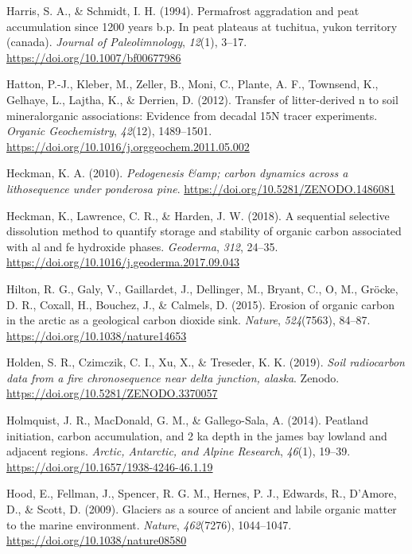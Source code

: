 \documentclass[]{article}
\begin{document}
\leavevmode\hypertarget{ref-Harris_1994}{}%
Harris, S. A., \& Schmidt, I. H. (1994). Permafrost aggradation and peat
accumulation since 1200 years b.p. In peat plateaus at tuchitua, yukon
territory (canada). \emph{Journal of Paleolimnology}, \emph{12}(1),
3--17. \url{https://doi.org/10.1007/bf00677986}

\leavevmode\hypertarget{ref-Hatton_2012}{}%
Hatton, P.-J., Kleber, M., Zeller, B., Moni, C., Plante, A. F.,
Townsend, K., Gelhaye, L., Lajtha, K., \& Derrien, D. (2012). Transfer
of litter-derived n to soil mineralorganic associations: Evidence from
decadal 15N tracer experiments. \emph{Organic Geochemistry},
\emph{42}(12), 1489--1501.
\url{https://doi.org/10.1016/j.orggeochem.2011.05.002}

\leavevmode\hypertarget{ref-https:ux2fux2fdoi.orgux2f10.5281ux2fzenodo.1486081}{}%
Heckman, K. A. (2010). \emph{Pedogenesis \&amp; carbon dynamics across a
lithosequence under ponderosa pine}.
\url{https://doi.org/10.5281/ZENODO.1486081}

\leavevmode\hypertarget{ref-Heckman_2018}{}%
Heckman, K., Lawrence, C. R., \& Harden, J. W. (2018). A sequential
selective dissolution method to quantify storage and stability of
organic carbon associated with al and fe hydroxide phases.
\emph{Geoderma}, \emph{312}, 24--35.
\url{https://doi.org/10.1016/j.geoderma.2017.09.043}

\leavevmode\hypertarget{ref-Hilton_2015}{}%
Hilton, R. G., Galy, V., Gaillardet, J., Dellinger, M., Bryant, C.,
O\textquotesingleRegan, M., Gröcke, D. R., Coxall, H., Bouchez, J., \&
Calmels, D. (2015). Erosion of organic carbon in the arctic as a
geological carbon dioxide sink. \emph{Nature}, \emph{524}(7563), 84--87.
\url{https://doi.org/10.1038/nature14653}

\leavevmode\hypertarget{ref-https:ux2fux2fdoi.orgux2f10.5281ux2fzenodo.3370057}{}%
Holden, S. R., Czimczik, C. I., Xu, X., \& Treseder, K. K. (2019).
\emph{Soil radiocarbon data from a fire chronosequence near delta
junction, alaska}. Zenodo. \url{https://doi.org/10.5281/ZENODO.3370057}

\leavevmode\hypertarget{ref-Holmquist_2014}{}%
Holmquist, J. R., MacDonald, G. M., \& Gallego-Sala, A. (2014). Peatland
initiation, carbon accumulation, and 2 ka depth in the james bay lowland
and adjacent regions. \emph{Arctic, Antarctic, and Alpine Research},
\emph{46}(1), 19--39. \url{https://doi.org/10.1657/1938-4246-46.1.19}

\leavevmode\hypertarget{ref-Hood_2009}{}%
Hood, E., Fellman, J., Spencer, R. G. M., Hernes, P. J., Edwards, R.,
D'Amore, D., \& Scott, D. (2009). Glaciers as a source of ancient and
labile organic matter to the marine environment. \emph{Nature},
\emph{462}(7276), 1044--1047. \url{https://doi.org/10.1038/nature08580}
\end{document}
